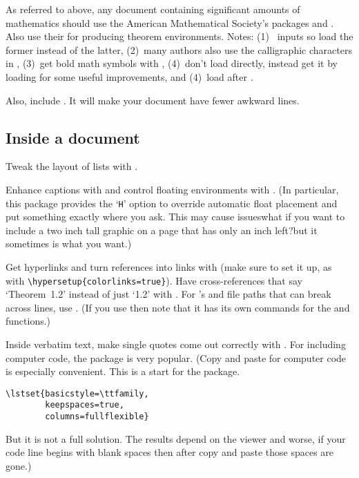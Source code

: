 \documentclass[11pt]{article}
\begin{document}
\begin{multicols*}{2}
As referred to above, any document containing significant amounts of 
mathematics should use 
the American Mathematical Society's packages
and 
.
Also use their 
for producing theorem environments.
Notes: (1)~ inputs  so load the former 
instead of the latter,
(2)~many authors also use the calligraphic characters in 
,
(3)~get bold math symbols with , 
(4)~don't load  directly, instead get it by loading 
 for some useful improvements,
and 
(4)~load  after .

Also, include
.
It will make 
your document have fewer awkward lines.



\subsection{Inside a document}
Tweak the layout of lists with .

Enhance captions with 
and control floating environments with 
.
(In particular, this package provides the `\texttt{H}' option 
to override automatic float placement and put something
exactly where you ask.
This may cause issues\Dash what if you want to include a two inch tall
graphic on a page that has only an inch left?\Dash but it sometimes
is what you want.)

Get hyperlinks and turn references into links with 
(make sure to set it up, 
as with \lstinline!\hypersetup{colorlinks=true}!).
Have cross-references that say `Theorem~1.2' instead of just `1.2'
with .
For 's and file paths that can break across lines, use 
.
(If you use  then note that it has its own 
commands for the  and  functions.)

Inside verbatim text, make single quotes come out correctly with 
.
For including computer code, the 
 package is very popular.
(Copy and paste for computer code is especially 
convenient.
This is a start for the  package.
\begin{lstlisting}
\lstset{basicstyle=\ttfamily,
        keepspaces=true,
        columns=fullflexible}
\end{lstlisting}
But it is not a full solution.  
The results depend on the \PDF{} viewer and 
worse, if your code line begins with
blank spaces then after copy and paste those spaces are gone.) 


\end{multicols*}
\end{document}
